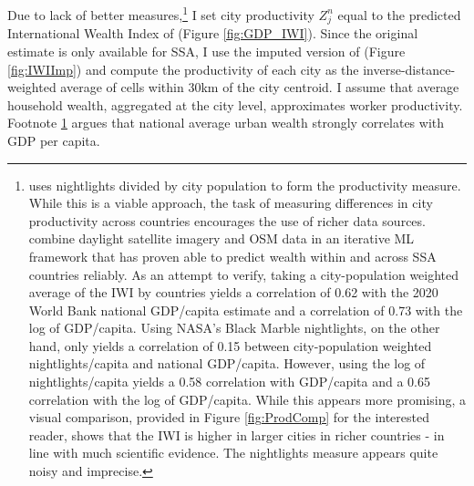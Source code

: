 \documentclass[a4paper]{article}
\begin{document}
Due to lack of better measures,\footnote{\label{fn:IWIprod}\citet{graff2019spatial} uses nightlights divided by city population to form the productivity measure. While this is a viable approach, the task of measuring differences in city productivity across countries encourages the use of richer data sources. \citet{lee2022high} combine daylight satellite imagery and OSM data in an iterative ML framework that has proven able to predict wealth within and across SSA countries reliably.  As an attempt to verify, taking a city-population weighted average of the IWI by countries yields a correlation of 0.62 with the 2020 World Bank national GDP/capita estimate and a correlation of 0.73 with the log of GDP/capita. Using NASA's Black Marble nightlights, on the other hand, only yields a correlation of 0.15 between city-population weighted nightlights/capita and national GDP/capita. However, using the log of nightlights/capita yields a 0.58 correlation with GDP/capita and a 0.65 correlation with the log of GDP/capita. While this appears more promising, a visual comparison, provided in Figure \ref{fig:ProdComp} for the interested reader, shows that the IWI is higher in larger cities in richer countries - in line with much scientific evidence. The nightlights measure appears quite noisy and imprecise.} 
I set city productivity $Z_j^n$ equal to the predicted International Wealth Index of \citet{lee2022high} (Figure \ref{fig:GDP_IWI}). Since the original estimate is only available for SSA, I use the imputed version of \citet{krantz2023mapping} (Figure \ref{fig:IWIImp}) and compute the productivity of each city as the inverse-distance-weighted average of cells within 30km of the city centroid. I assume that average household wealth, aggregated at the city level, approximates worker productivity. Footnote \ref{fn:IWIprod} argues that national average urban wealth strongly correlates with GDP per capita.  \newline
\end{document}
